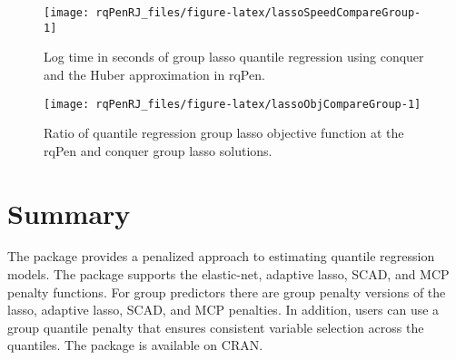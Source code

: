 \begin{figure}

{\centering \texttt{[image: rqPenRJ\_files/figure-latex/lassoSpeedCompareGroup-1]} 

}

\caption{Log time in seconds of group lasso quantile regression using conquer and the Huber approximation in rqPen.}\label{fig:lassoSpeedCompareGroup}
\end{figure}

\begin{figure}

{\centering \texttt{[image: rqPenRJ\_files/figure-latex/lassoObjCompareGroup-1]} 

}

\caption{Ratio of quantile regression group lasso objective function at the rqPen and conquer group lasso solutions.}\label{fig:lassoObjCompareGroup}
\end{figure}

\section{Summary}\label{summary}

The  package provides a penalized approach to estimating quantile regression models. The package supports the elastic-net, adaptive lasso, SCAD, and MCP penalty functions. For group predictors there are group penalty versions of the lasso, adaptive lasso, SCAD, and MCP penalties. In addition, users can use a group quantile penalty that ensures consistent variable selection across the quantiles. The package is available on CRAN.

